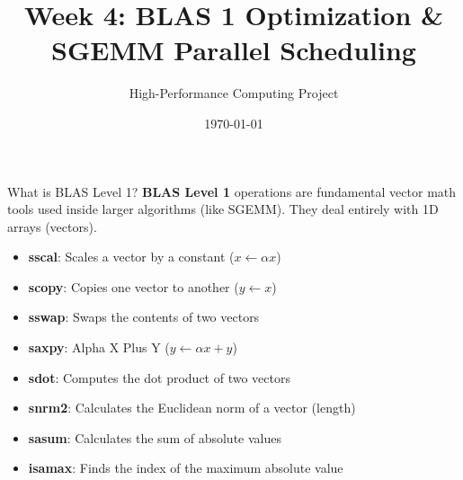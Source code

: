 \documentclass{beamer}
\title{Week 4: BLAS 1 Optimization \& SGEMM Parallel Scheduling}
\author{High-Performance Computing Project}
\date{\today}
\begin{document}
\frame{\titlepage}

\begin{frame}{What is BLAS Level 1?}
    \textbf{BLAS Level 1} operations are fundamental vector math tools used inside larger algorithms (like SGEMM). They deal entirely with 1D arrays (vectors).
    \vspace{0.4cm}
    \begin{itemize}
        \item \textbf{sscal}: Scales a vector by a constant ($x \leftarrow \alpha x$)
        \item \textbf{scopy}: Copies one vector to another ($y \leftarrow x$)
        \item \textbf{sswap}: Swaps the contents of two vectors
        \item \textbf{saxpy}: Alpha X Plus Y ($y \leftarrow \alpha x + y$)
        \item \textbf{sdot}: Computes the dot product of two vectors
        \item \textbf{snrm2}: Calculates the Euclidean norm of a vector (length)
        \item \textbf{sasum}: Calculates the sum of absolute values
        \item \textbf{isamax}: Finds the index of the maximum absolute value
    \end{itemize}
\end{frame}
\end{document}
